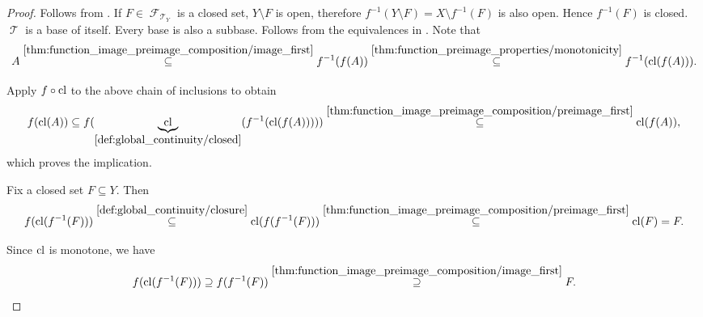 \begin{proof}
   Follows from .
   If \( F \in \mscrF_{\mscrT_Y} \) is a closed set, \( Y \setminus F \) is open, therefore \( f^{-1}(Y \setminus F) = X \setminus f^{-1}(F) \) is also open. Hence \( f^{-1}(F) \) is closed.
   \( \mscrT \) is a base of itself.
   Every base is also a subbase.
   Follows from the equivalences in .
   Note that
  \begin{equation*}
    A
    \overset {\ref{thm:function_image_preimage_composition/image_first}} \subseteq
    f^{-1}(f(A))
    \overset {\ref{thm:function_preimage_properties/monotonicity}} \subseteq
    f^{-1}(\operatorname{cl}(f(A))).
  \end{equation*}

  Apply \( f \circ \operatorname{cl} \) to the above chain of inclusions to obtain
  \begin{equation*}
    f(\operatorname{cl}(A))
    \subseteq
    f(\underbrace{\operatorname{cl}}_{\ref{def:global_continuity/closed}}(f^{-1}(\operatorname{cl}(f(A)))))
    \overset {\ref{thm:function_image_preimage_composition/preimage_first}} \subseteq
    \operatorname{cl}(f(A)),
  \end{equation*}
  which proves the implication.

   Fix a closed set \( F \subseteq Y \). Then
  \begin{equation}\label{def:global_continuity/closure_implies_closed_right}
    f(\operatorname{cl}(f^{-1}(F)))
    \overset {\ref{def:global_continuity/closure}} \subseteq
    \operatorname{cl}(f(f^{-1}(F)))
    \overset {\ref{thm:function_image_preimage_composition/preimage_first}} \subseteq
    \operatorname{cl}(F)
    =
    F.
  \end{equation}

  Since \( \operatorname{cl} \) is monotone, we have
  \begin{equation}\label{def:global_continuity/closure_implies_closed_left}
    f(\operatorname{cl}(f^{-1}(F)))
    \supseteq
    f(f^{-1}(F))
    \overset {\ref{thm:function_image_preimage_composition/image_first}} \supseteq
    F.
  \end{equation}


\end{proof}
